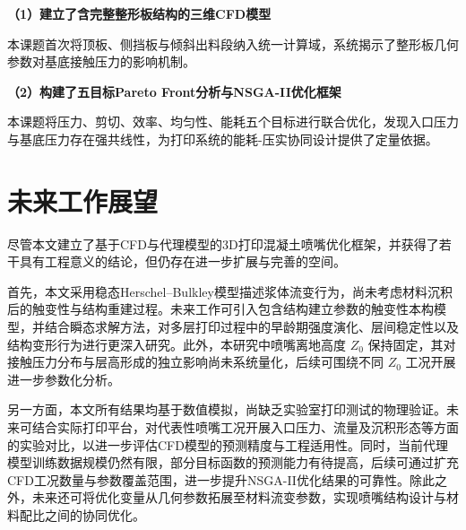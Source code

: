 \textbf{（1）建立了含完整整形板结构的三维CFD模型}

本课题首次将顶板、侧挡板与倾斜出料段纳入统一计算域，系统揭示了整形板几何参数对基底接触压力的影响机制。

\textbf{（2）构建了五目标Pareto Front分析与NSGA-II优化框架}

本课题将压力、剪切、效率、均匀性、能耗五个目标进行联合优化，发现入口压力与基底压力存在强共线性，为打印系统的能耗-压实协同设计提供了定量依据。

\section{未来工作展望}

尽管本文建立了基于CFD与代理模型的3D打印混凝土喷嘴优化框架，并获得了若干具有工程意义的结论，但仍存在进一步扩展与完善的空间。

首先，本文采用稳态Herschel--Bulkley模型描述浆体流变行为，尚未考虑材料沉积后的触变性与结构重建过程。未来工作可引入包含结构建立参数的触变性本构模型，并结合瞬态求解方法，对多层打印过程中的早龄期强度演化、层间稳定性以及结构变形行为进行更深入研究。此外，本研究中喷嘴离地高度 $Z_0$ 保持固定，其对接触压力分布与层高形成的独立影响尚未系统量化，后续可围绕不同 $Z_0$ 工况开展进一步参数化分析。

另一方面，本文所有结果均基于数值模拟，尚缺乏实验室打印测试的物理验证。未来可结合实际打印平台，对代表性喷嘴工况开展入口压力、流量及沉积形态等方面的实验对比，以进一步评估CFD模型的预测精度与工程适用性。同时，当前代理模型训练数据规模仍然有限，部分目标函数的预测能力有待提高，后续可通过扩充CFD工况数量与参数覆盖范围，进一步提升NSGA-II优化结果的可靠性。除此之外，未来还可将优化变量从几何参数拓展至材料流变参数，实现喷嘴结构设计与材料配比之间的协同优化。
